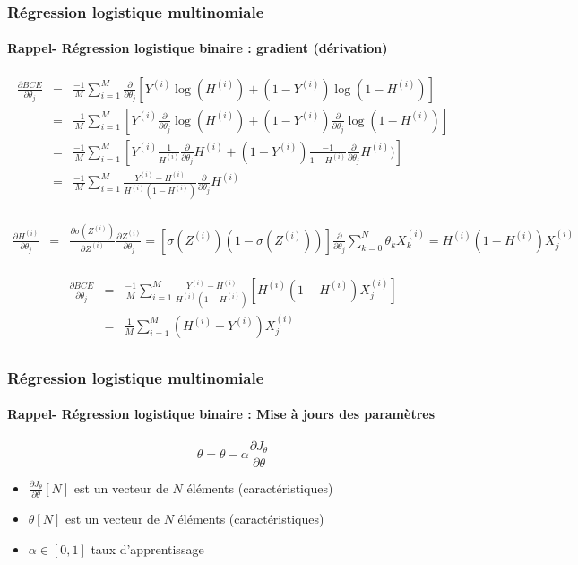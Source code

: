 \documentclass[xcolor=table]{beamer}
\begin{document}
\begin{frame}
	\frametitle{Régression logistique multinomiale}
	\framesubtitle{Rappel- Régression logistique binaire : gradient (dérivation)}
	
	\scriptsize
	\vspace{-16pt}
	\begin{align*}
	\frac{\partial BCE}{\partial \theta_j} 
	& = & \frac{-1}{M} \sum\limits_{i=1}^{M} \frac{\partial}{\partial \theta_j} [Y^{(i)} \log(H^{(i)}) + (1- Y^{(i)}) \log(1 - H^{(i)})] \\
	& = & \frac{-1}{M} \sum\limits_{i=1}^{M} [ Y^{(i)} \frac{\partial}{\partial \theta_j} \log(H^{(i)}) + (1- Y^{(i)}) \frac{\partial}{\partial \theta_j}\log(1 - H^{(i)})]\\
	& = & \frac{-1}{M} \sum\limits_{i=1}^{M} [ Y^{(i)} \frac{1}{H^{(i)}} \frac{\partial}{\partial \theta_j} H^{(i)} + (1- Y^{(i)}) \frac{-1}{1-H^{(i)}} \frac{\partial}{\partial \theta_j} H^{(i)})] \\
	& = & \frac{-1}{M} \sum\limits_{i=1}^{M} \frac{Y^{(i)}-H^{(i)}}{H^{(i)}(1-H^{(i)})} \frac{\partial}{\partial \theta_j} H^{(i)} \\
	\end{align*}
	
	\vspace{-26pt}
	\begin{align*}
	\frac{\partial H^{(i)}}{\partial \theta_j} 
	& = & \frac{\partial \sigma(Z^{(i)})}{\partial Z^{(i)}} \frac{\partial Z^{(i)}}{\partial \theta_j}
	 =  [\sigma(Z^{(i)}) (1-\sigma(Z^{(i)}))]\frac{\partial}{\partial \theta_j} \sum\limits_{k=0}^{N} \theta_k X_k^{(i)} 
	 =  H^{(i)} (1-H^{(i)})  X_j^{(i)}\\
	\end{align*}
	
	\vspace{-24pt}
	\begin{align*}
	\frac{\partial BCE}{\partial \theta_j} 
	& = & \frac{-1}{M} \sum\limits_{i=1}^{M} \frac{Y^{(i)}-H^{(i)}}{H^{(i)}(1-H^{(i)})} [H^{(i)} (1-H^{(i)}) X_j^{(i)}] \\
	& = & \frac{1}{M} \sum\limits_{i=1}^{M} (H^{(i)} - Y^{(i)}) X_j^{(i)}\\
	\end{align*}
		
\end{frame}

\begin{frame}
	\frametitle{Régression logistique multinomiale}
	\framesubtitle{Rappel- Régression logistique binaire : Mise à jours des paramètres}
	
	\[\theta = \theta - \alpha \frac{\partial J_\theta}{\partial \theta}\]
	
	\begin{itemize}
		\item $\frac{\partial J_\theta}{\partial \theta}[N]$ est un vecteur de $N$ éléments (caractéristiques)
		\item $\theta[N]$ est un vecteur de $N$ éléments (caractéristiques)
		\item $\alpha \in [0, 1]$ taux d'apprentissage
	\end{itemize}
	
\end{frame}
\end{document}
